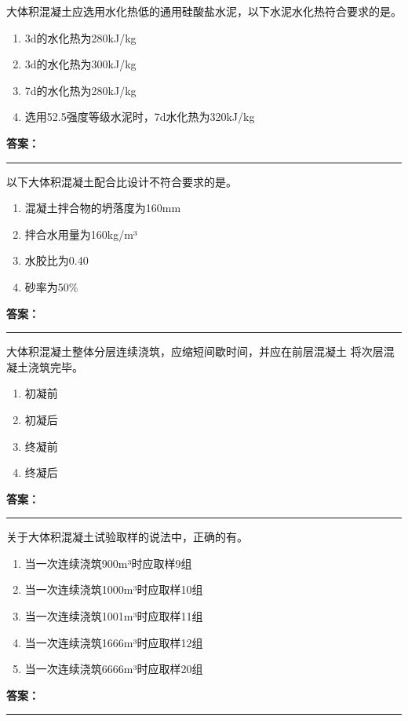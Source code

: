 \documentclass[UTF8,fontset=fandol,11pt]{ctexart}
\newcommand{\answerline}{\textcolor{answerred}{\rule{2.4cm}{0.7pt}}}
\begin{document}
\begin{quizbox}[title={第 85 题}]
大体积混凝土应选用水化热低的通用硅酸盐水泥，以下水泥水化热符合要求的是。\\
\begin{enumerate}[label=\Alph*.]
\item 3d的水化热为280kJ/kg
\item 3d的水化热为300kJ/kg
\item 7d的水化热为280kJ/kg
\item 选用52.5强度等级水泥时，7d水化热为320kJ/kg
\end{enumerate}
\textbf{\textcolor{answerred}{答案：}} \answerline
\end{quizbox}

\begin{quizbox}[title={第 86 题}]
以下大体积混凝土配合比设计不符合要求的是。\\
\begin{enumerate}[label=\Alph*.]
\item 混凝土拌合物的坍落度为160mm
\item 拌合水用量为160kg/m³
\item 水胶比为0.40
\item 砂率为50\%
\end{enumerate}
\textbf{\textcolor{answerred}{答案：}} \answerline
\end{quizbox}

\begin{quizbox}[title={第 87 题}]
大体积混凝土整体分层连续浇筑，应缩短间歇时间，并应在前层混凝土 将次层混凝土浇筑完毕。\\
\begin{enumerate}[label=\Alph*.]
\item 初凝前
\item 初凝后
\item 终凝前
\item 终凝后
\end{enumerate}
\textbf{\textcolor{answerred}{答案：}} \answerline
\end{quizbox}

\begin{quizbox}[title={第 88 题}]
关于大体积混凝土试验取样的说法中，正确的有。\\
\begin{enumerate}[label=\Alph*.]
\item 当一次连续浇筑900m³时应取样9组
\item 当一次连续浇筑1000m³时应取样10组
\item 当一次连续浇筑1001m³时应取样11组
\item 当一次连续浇筑1666m³时应取样12组
\item 当一次连续浇筑6666m³时应取样20组
\end{enumerate}
\textbf{\textcolor{answerred}{答案：}} \answerline
\end{quizbox}
\end{document}
